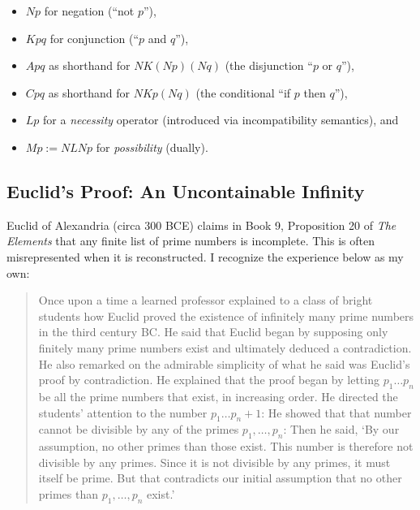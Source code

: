 \documentclass[12pt]{book}
\begin{document}





\begin{itemize}
 \item $N p$ for negation (``not $p$''),
 \item $Kpq$ for conjunction (``$p$ and $q$''),
 \item $A p q$ as shorthand for $N K (N p)(N q)$ (the disjunction ``$p$ or $q$''),
 \item $C p q$ as shorthand for $N K p (N q)$ (the conditional ``if $p$ then $q$''),
 \item $L p$ for a \textit{necessity} operator (introduced via incompatibility semantics), and 
 \item $M p := N L N p$ for \textit{possibility} (dually).
\end{itemize}


\subsection{Euclid's Proof: An Uncontainable Infinity}
Euclid of Alexandria (circa 300 BCE) claims in Book 9, Proposition 20 of \textit{The Elements}\parencite*{euclid_euclids_2007} that any finite list of prime numbers is incomplete. This is often misrepresented when it is reconstructed.  I recognize the experience below as my own:
\begin{quotation}
    Once upon a time a learned professor explained to a class of bright students how Euclid proved the existence of infinitely many prime numbers in the third century BC. He said that Euclid began by supposing only finitely many prime numbers exist and ultimately deduced a contradiction. He also remarked on the admirable simplicity of what he said was Euclid's proof by contradiction. He explained that the proof began by letting $p_1 \ldots p_n$ be all the prime numbers that exist, in increasing order. He directed the students' attention to the number $p_1\ldots p_n+1$: He showed that that number cannot be divisible by any of the primes $p_1,\ldots, p_n$: Then he said,  `By our assumption, no other primes than those exist. This number is therefore not divisible by any primes. Since it is not divisible by any primes, it must itself be prime. But that contradicts our initial assumption that no other primes than $p_1, \ldots, p_n$ exist.'\parencite{hardy2009prime} 
\end{quotation}
\end{document}
